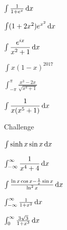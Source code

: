 \documentclass[11pt]{beamer}
\newcommand{\makeslide}[1]{
    \begin{frame}
    \Huge
    \begin{center}
    #1
    \end{center}
    \end{frame}
    \begin{frame}
    \end{frame}
}
\begin{document}
\makeslide{
$\int \frac{1}{1 + e^x} \dif x$
}

\makeslide{
$\int (1+2x^2)e^{x^2} \dif x$
}

\makeslide{
$\int{\dfrac{e^{ix}}{x^2 + 1} \dif x} $
}

\makeslide{
$\int x(1-x)^{2017}$
}

\makeslide{
$\int_{-\pi}^{\pi} \frac{x^3-2x}{\sqrt{x^4+1}}$
}

\makeslide{
$\int{\dfrac{1}{x(x^5 + 1)} \dif x}$
}

\makeslide{Challenge }

\makeslide{
$\int \sinh x \sin x \dif x$
}

\makeslide{
$\int_{-\infty}^{\infty}{\dfrac{1}{x^4 + 4} \dif x} $
}

\makeslide{
$\int \frac{\ln x \cos x - \frac{1}{x}\sin x}{\ln^2 x} \dif x$
}

\makeslide{
$\int_{-\infty}^\infty \frac{1}{1+x^2} \dif x$
}

\makeslide{
$\int ^{\infty }_0\frac{3\sqrt{3}}{1+x^3} \dif x$
}
\end{document}
